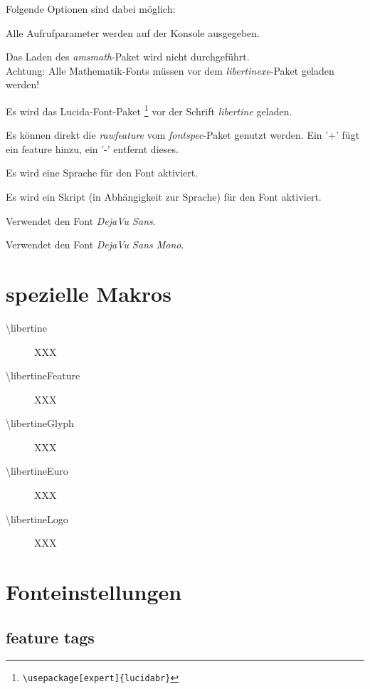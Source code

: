\documentclass{fontdoku}
\begin{document}
Folgende Optionen sind dabei möglich:
\begin{description}
\item [debug] Alle Aufrufparameter werden auf der Konsole ausgegeben.
\item [noamsmath] Das Laden des \emph{amsmath}-Paket wird nicht durchgeführt.\\
      Achtung: Alle Mathematik-Fonts müssen vor dem \emph{libertinexe}-Paket
      geladen werden!
\item [lucida] Es wird das Lucida-Font-Paket%
      \footnote{\texttt{\textbackslash usepackage[expert]\{lucidabr\}}}
      vor der Schrift \emph{libertine} geladen.
\item [rawfeature] Es können direkt die \emph{rawfeature} vom \emph{fontspec}-Paket genutzt werden.
      Ein '+' fügt ein feature hinzu, ein '-' entfernt dieses.
\item [langauge] Es wird eine Sprache für den Font aktiviert.
\item [script]   Es wird ein Skript (in Abhängigkeit zur Sprache) für den Font aktiviert.
\item [dejavusans] Verwendet den Font \emph{DejaVu Sans}.
\item [dejavusansmono] Verwendet den Font \emph{DejaVu Sans Mono}.
\end{description}

\section{spezielle Makros}

\begin{description}
\item [\textbackslash libertine] XXX
\item [\textbackslash libertineFeature] XXX
\item [\textbackslash libertineGlyph] XXX
\item [\textbackslash libertineEuro] XXX
\item [\textbackslash libertineLogo] XXX
\end{description}


\newpage
\section{Fonteinstellungen}

\subsection{feature tags}
\end{document}
